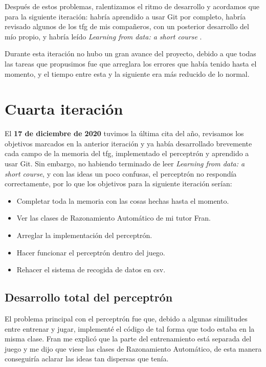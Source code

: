 Después de estos problemas, ralentizamos el ritmo de desarrollo y acordamos que para la siguiente iteración: habría aprendido a usar Git por completo, habría revisado algunos de los \gls{tfg} de mis compañeros, con un posterior desarrollo del mío propio, y habría leído \textit{Learning from data: a short course} \cite{LearningFromData} .

Durante esta iteración no hubo un gran avance del proyecto, debido a que todas las tareas que propusimos fue que arreglara los errores que había tenido hasta el momento, y el tiempo entre esta y la siguiente era más reducido de lo normal.

\section{Cuarta iteración}
El \textbf{17 de diciembre de 2020} tuvimos la última cita del año, revisamos los objetivos marcados en la anterior iteración y ya había desarrollado brevemente cada campo de la memoria del \gls{tfg}, implementado el perceptrón y aprendido a usar Git. Sin embargo, no habiendo terminado de leer \textit{Learning from data: a short course}, y con las ideas un poco confusas, el perceptrón no respondía correctamente, por lo que los objetivos para la siguiente iteración serían:
\begin{itemize}
  \item Completar toda la memoria con las cosas hechas hasta el momento.
  \item Ver las clases de Razonamiento Automático de mi tutor Fran.
  \item Arreglar la implementación del perceptrón.
  \item Hacer funcionar el perceptrón dentro del juego.
  \item Rehacer el sistema de recogida de datos en \gls{csv}.
\end{itemize}

\subsection{Desarrollo total del perceptrón}
El problema principal con el perceptrón fue que, debido a algunas similitudes entre entrenar y jugar, implementé el código de tal forma que todo estaba en la misma clase. Fran me explicó que la parte del entrenamiento está separada del juego y me dijo que viese las clases de Razonamiento Automático, de esta manera conseguiría aclarar las ideas tan dispersas que tenía. 

